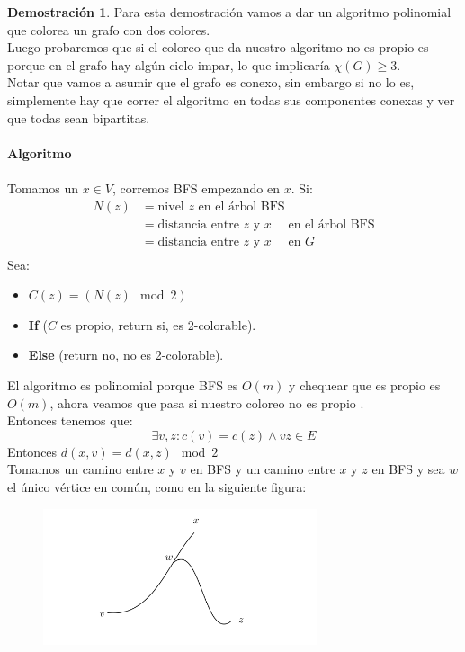 \documentclass[11pt, a4paper]{article}
\theoremstyle{definition}
\newtheorem*{demostracion}{Demostración}
\begin{document}
\begin{demostracion}

Para esta demostración vamos a dar un algoritmo polinomial que colorea un grafo con dos
colores.\\ 
Luego probaremos que si el coloreo que da nuestro algoritmo no es propio
es porque en el grafo hay algún ciclo impar, lo que implicaría $\chi(G) \geq 3$.\\
Notar que vamos a asumir que el grafo es conexo, sin embargo si no lo es,
simplemente hay que correr el algoritmo en todas sus componentes conexas
y ver que todas sean bipartitas.\\ \\
\textbf{Algoritmo}\\ \\
    Tomamos un $x \in V$, corremos BFS empezando en $x$. Si:
    \begin{align*}
        N(z) &= \text{nivel } z \text{ en el árbol BFS} \\[6pt]
             &= \text{distancia entre } z \text{ y } x \quad  \text{ en el árbol BFS} \\[6pt]
             &= \text{distancia entre } z \text{ y } x \quad  \text{ en } G \\[6pt]
    \end{align*}
    Sea:
    \begin{itemize}
        \item $C(z) = (N(z) \mod 2)$
        \item \textbf{If} ($C$ es propio, return si, es 2-colorable).
        \item \textbf{Else} (return no, no es 2-colorable).
    \end{itemize}
    El algoritmo es polinomial porque BFS es $O(m)$ y chequear que es propio es $O(m)$, ahora veamos que pasa si nuestro coloreo no es propio .\\
    Entonces tenemos que:     
    \[
    \exists v, z : c(v) = c(z) \land vz \in E
    \]
    Entonces $d(x, v) = d(x, z) \mod 2$\\
    Tomamos un camino entre $x$ y $v$ en BFS y un camino entre $x$ y $z$ en BFS y sea $w$ el único vértice en común, como en la siguiente figura:
    \begin{figure}[!h]
        \centering 
        \includegraphics[height=4cm]{Figure 1 2-color.png} 
    \end{figure}
    

\end{demostracion}
\end{document}
